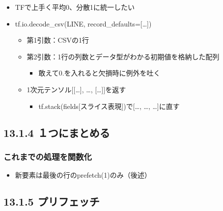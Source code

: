 \begin{itemize}
\tightlist
\item
  TFで上手く平均0、分散1に統一したい
\item
  tf.io.decode\_csv(LINE, record\_defaults={[}\ldots{]})

  \begin{itemize}
  \tightlist
  \item
    第1引数：CSVの1行
  \item
    第2引数：1行の列数とデータ型がわかる初期値を格納した配列

    \begin{itemize}
    \tightlist
    \item
      敢えて0.を入れると欠損時に例外を吐く
    \end{itemize}
  \item
    1次元テンソル{[}{[}\ldots{]}, \ldots, {[}\ldots{]}{]}を返す

    \begin{itemize}
    \tightlist
    \item
      tf.stack(fields{[}スライス表現{]})で{[}\ldots, \ldots,
      \ldots{]}に直す
    \end{itemize}
  \end{itemize}
\end{itemize}

\hypertarget{ux3064ux306bux307eux3068ux3081ux308b}{%
\subsection{13.1.4
１つにまとめる}\label{ux3064ux306bux307eux3068ux3081ux308b}}

\hypertarget{ux3053ux308cux307eux3067ux306eux51e6ux7406ux3092ux95a2ux6570ux5316}{%
\subsubsection{これまでの処理を関数化}\label{ux3053ux308cux307eux3067ux306eux51e6ux7406ux3092ux95a2ux6570ux5316}}

\begin{itemize}
\tightlist
\item
  新要素は最後の行のprefetch(1)のみ（後述）
\end{itemize}

\hypertarget{ux30d7ux30eaux30d5ux30a7ux30c3ux30c1}{%
\subsection{13.1.5
プリフェッチ}\label{ux30d7ux30eaux30d5ux30a7ux30c3ux30c1}}

